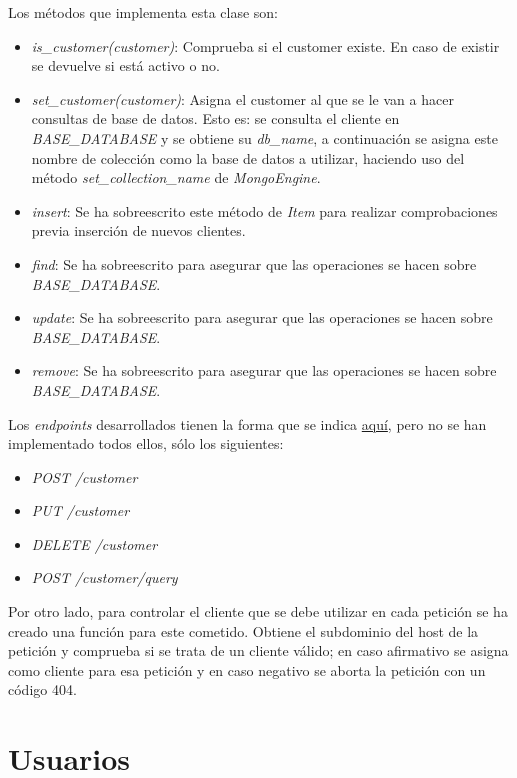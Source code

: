 \bigskip
Los métodos que implementa esta clase son:
\begin{itemize}
	\item \textit{is\_customer(customer)}: Comprueba si el customer existe. En caso de existir se devuelve si está activo o no.
	\item \textit{set\_customer(customer)}: Asigna el customer al que se le van a hacer consultas de base de datos. Esto es: se consulta el cliente en \textit{BASE\_DATABASE} y se obtiene su \textit{db\_name}, a continuación se asigna este nombre de colección como la base de datos a utilizar, haciendo uso del método \textit{set\_collection\_name} de \textit{MongoEngine}.
	\item \textit{insert}: Se ha sobreescrito este método de \textit{Item} para realizar comprobaciones previa inserción de nuevos clientes.
	\item \textit{find}: Se ha sobreescrito para asegurar que las operaciones se hacen sobre \textit{BASE\_DATABASE}.
	\item \textit{update}: Se ha sobreescrito para asegurar que las operaciones se hacen sobre \textit{BASE\_DATABASE}.
	\item \textit{remove}: Se ha sobreescrito para asegurar que las operaciones se hacen sobre \textit{BASE\_DATABASE}.
\end{itemize}


\bigskip
Los \textit{endpoints} desarrollados tienen la forma que se indica \hyperref[sec:servicios]{aquí}, pero no se han implementado todos ellos, sólo los siguientes:
\begin{itemize}
	\item \textit{POST /customer}
	\item \textit{PUT /customer}
	\item \textit{DELETE /customer}
	\item \textit{POST /customer/query}
\end{itemize}


\bigskip
Por otro lado, para controlar el cliente que se debe utilizar en cada petición se ha creado una función para este cometido. Obtiene el subdominio del host de la petición y comprueba si se trata de un cliente válido; en caso afirmativo se asigna como cliente para esa petición y en caso negativo se aborta la petición con un código 404.




\section{Usuarios}


